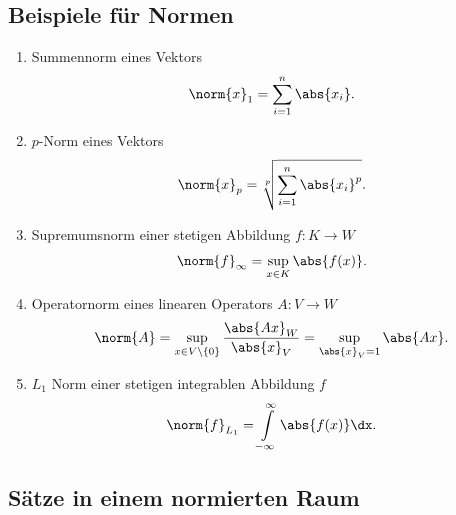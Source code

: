 \subsection{Beispiele für Normen}

\begin{enumerate}
  \item Summennorm eines Vektors
  \begin{align*}
  \norm{x}_1 = \sum\limits_{i=1}^n\abs{x_i}.
  \end{align*}
  \item $p$-Norm eines Vektors
  \begin{align*}
  \norm{x}_p = \sqrt[p]{\sum\limits_{i=1}^n\abs{x_i}^p}.
  \end{align*}
  \item Supremumsnorm einer stetigen Abbildung $f: K\to W$
  \begin{align*}
  \norm{f}_\infty = \sup\limits_{x\in K} \abs{f(x)}.
  \end{align*}
  \item Operatornorm eines linearen Operators $A: V\to W$
  \begin{align*}
  \norm{A} = \sup\limits_{x\in V\setminus \{0\}} \frac{\abs{Ax}_W}{\abs{x}_V} =
  \sup\limits_{\abs{x}_V = 1} \abs{Ax}.
  \end{align*}
  \item $L_1$ Norm einer stetigen integrablen Abbildung $f$
  \begin{align*}
  \norm{f}_{L_1} = \int\limits_{-\infty}^\infty \abs{f(x)}\dx.
  \end{align*}
\end{enumerate}

\subsection{Sätze in einem normierten Raum}

